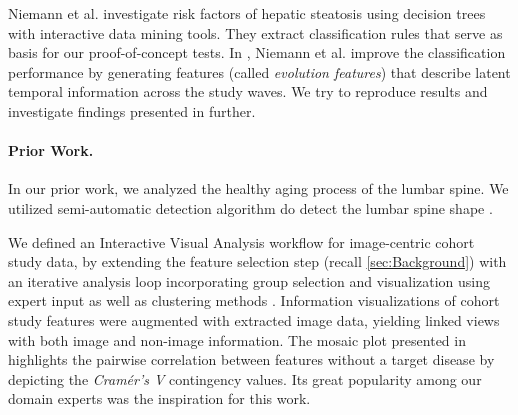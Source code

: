 \documentclass[journal]{style/vgtc} 			          %
\newcommand{\com}[1]{\textcolor{orange}{\uline{#1}}}
\begin{document}
Niemann et al. \cite{Niemann2014} investigate risk factors of hepatic steatosis using decision trees with interactive data mining tools.
They extract classification rules that serve as basis for our proof-of-concept tests.
In \cite{Niemann2015}, Niemann et al. improve the classification performance by generating features (called \emph{evolution features}) that describe latent temporal information across the study waves.
We try to reproduce results and investigate findings presented in \cite{Niemann2014} further.

\paragraph{Prior Work.}
In our prior work, we analyzed the healthy aging process of the lumbar spine.
We utilized semi-automatic detection algorithm do detect the lumbar spine shape \cite{Klemm2013VMV}.

We defined an Interactive Visual Analysis workflow for image-centric cohort study data, by extending the feature selection step (recall \ref{sec:Background}) with an iterative analysis loop incorporating group selection and visualization using expert input as well as clustering methods \cite{Klemm2014VIS}.
Information visualizations of cohort study features were augmented with extracted image data, yielding linked views with both image and non-image information.
The mosaic plot presented in \cite{Klemm2014VIS} highlights the pairwise correlation between features without a target disease by depicting the \emph{Cram\'{e}r's V} contingency values.
Its great popularity among our domain experts was the inspiration for this work.
\end{document}
